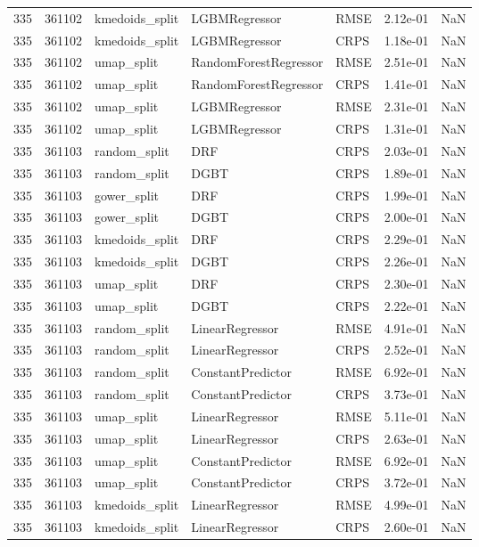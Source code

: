 \begin{tabular}{rrlllrr}
335 & 361102 & kmedoids\_split & LGBMRegressor & RMSE & 2.12e-01 & NaN \\
335 & 361102 & kmedoids\_split & LGBMRegressor & CRPS & 1.18e-01 & NaN \\
335 & 361102 & umap\_split & RandomForestRegressor & RMSE & 2.51e-01 & NaN \\
335 & 361102 & umap\_split & RandomForestRegressor & CRPS & 1.41e-01 & NaN \\
335 & 361102 & umap\_split & LGBMRegressor & RMSE & 2.31e-01 & NaN \\
335 & 361102 & umap\_split & LGBMRegressor & CRPS & 1.31e-01 & NaN \\
335 & 361103 & random\_split & DRF & CRPS & 2.03e-01 & NaN \\
335 & 361103 & random\_split & DGBT & CRPS & 1.89e-01 & NaN \\
335 & 361103 & gower\_split & DRF & CRPS & 1.99e-01 & NaN \\
335 & 361103 & gower\_split & DGBT & CRPS & 2.00e-01 & NaN \\
335 & 361103 & kmedoids\_split & DRF & CRPS & 2.29e-01 & NaN \\
335 & 361103 & kmedoids\_split & DGBT & CRPS & 2.26e-01 & NaN \\
335 & 361103 & umap\_split & DRF & CRPS & 2.30e-01 & NaN \\
335 & 361103 & umap\_split & DGBT & CRPS & 2.22e-01 & NaN \\
335 & 361103 & random\_split & LinearRegressor & RMSE & 4.91e-01 & NaN \\
335 & 361103 & random\_split & LinearRegressor & CRPS & 2.52e-01 & NaN \\
335 & 361103 & random\_split & ConstantPredictor & RMSE & 6.92e-01 & NaN \\
335 & 361103 & random\_split & ConstantPredictor & CRPS & 3.73e-01 & NaN \\
335 & 361103 & umap\_split & LinearRegressor & RMSE & 5.11e-01 & NaN \\
335 & 361103 & umap\_split & LinearRegressor & CRPS & 2.63e-01 & NaN \\
335 & 361103 & umap\_split & ConstantPredictor & RMSE & 6.92e-01 & NaN \\
335 & 361103 & umap\_split & ConstantPredictor & CRPS & 3.72e-01 & NaN \\
335 & 361103 & kmedoids\_split & LinearRegressor & RMSE & 4.99e-01 & NaN \\
335 & 361103 & kmedoids\_split & LinearRegressor & CRPS & 2.60e-01 & NaN \\

\end{tabular}

